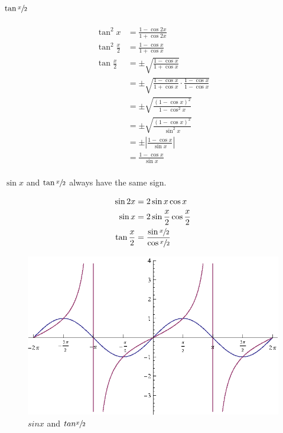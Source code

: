 \documentclass{exam}
\begin{document}
  \subsection{$\tan \sfrac{x}{2}$}
  \begin{align*}
    \tan^2 x           & = \frac{1 - \cos 2x}{1 + \cos 2x} \\
    \tan^2 \frac{x}{2} & = \frac{1 - \cos x}{1 + \cos x} \\
    \tan \frac{x}{2}   & = \pm \sqrt{ \frac{1 - \cos x}{1 + \cos x} } \\
                       & = \pm \sqrt{ \frac{1 - \cos x}{1 + \cos x} \cdot \frac{1 - \cos x}{1 - \cos x} } \\
                       & = \pm \sqrt{ \frac{(1 - \cos x)^2}{1 - \cos^2 x} } \\
                       & = \pm \sqrt{ \frac{(1 - \cos x)^2}{\sin^2 x} } \\
                       & = \pm \left| \frac{1 - \cos x}{\sin x} \right| \\
                       & = \frac{1 - \cos x}{\sin x} \\
  \end{align*}

  $\sin x$ and $\tan \sfrac{x}{2}$ always have the same sign.

  \begin{align*}
    \sin 2x          & = 2 \sin x \cos x \\
    \sin x           & = 2 \sin \frac{x}{2} \cos \frac{x}{2} \\
    \tan \frac{x}{2} & = \frac{\sin \sfrac{x}{2}}{\cos \sfrac{x}{2}} \\
  \end{align*}

  \begin{figure}[H]
    \centering
    \includegraphics[scale=0.8]{sinx_tanx2}
    \caption{$sin x$ and $tan \sfrac{x}{2}$}
  \end{figure}
\end{document}
